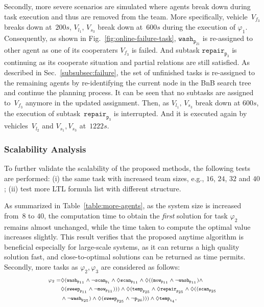  



Secondly, more severe scenarios are simulated where agents break down
during task execution and thus are removed from the team.
More specifically, vehicle~$V_{f_3}$ breaks down at~$200s$, $V_{l_1},\, V_{s_3}$ break
down at~$600s$ during the execution of $\varphi_1$.
Consequently, as shown in Fig.~\ref{fig:online-failure-task}, $\texttt{wash}_{\texttt{p}_{21}}$
is re-assigned to other agent as one of its cooperaters $V_{f_3}$ is failed. And subtask 
$\texttt{repair}_{\texttt{p}_{3}}$ is continuing as its cooperate situation and partial relations 
are still satisfied. As described in Sec.~\ref{subsubsec:failure},
the set of unfinished tasks is re-assigned to the remaining agents by re-identifying
the current node in the BnB search tree and continue the planning process.
It can be seen that no subtasks are assigned to~$V_{f_3}$ anymore in the updated assignment.
Then, as $V_{l_1},\, V_{s_3}$ break down at $600s$, the execution of subtask~$\texttt{repair}_{\texttt{p}_{3}}$ 
is interrupted. And it is executed again by vehicles~$V_{l_2}$ and $V_{s_1},V_{s_3}$ at~$1222s$.



\subsubsection{Scalability Analysis}\label{subsubsec:scalable}
To further validate the scalability of the proposed methods,
the following tests are performed:
(i) the same task with increased team sizes,
e.g., $16$, $24$, $32$ and $40$;
(ii) test more LTL formula list with different structure. 

As summarized in Table~\ref{table:more-agents},
as the system size is increased from~$8$ to $40$,
the computation time to obtain the \emph{first}
solution for task $\varphi_2$ remains almost unchanged,
while the time taken to compute the optimal value increases slightly.
This result verifies that the proposed anytime algorithm is beneficial
especially for large-scale systems, as it can returns a high quality solution fast,
and close-to-optimal solutions can be returned as time permits.
Secondly, more tasks as $\varphi_2,\varphi_3$ are considered as follows:
\begin{equation}\scriptsize
\label{eq:task2}
\begin{aligned}
\varphi_2 = &\Diamond (\texttt{wash}_{\texttt{p}_{11}} \land \lnot\texttt{scan}_{\texttt{p}_i} 
\wedge\Diamond \texttt{scan}_{\texttt{p}_{11}}\wedge \Diamond ((\texttt{mow}_{\texttt{p}_{11}}
\wedge\lnot \texttt{wash}_{\texttt{p}_{11}} )\wedge\\
&\Diamond (\texttt{sweep}_{\texttt{p}_{11}} \land \lnot\texttt{mow}_{\texttt{p}_{11}} )))\wedge
\Diamond (\texttt{temp}_{\texttt{p}_{25}} \land \Diamond \texttt{repair}_{\texttt{p}_{25}}\wedge \Diamond ((\texttt{scan}_{\texttt{p}_{25}}\\
&\wedge\lnot \texttt{wash}_{\texttt{p}_{25}} ) \wedge\Diamond (\texttt{sweep}_{\texttt{p}_{25}} \land \lnot{\texttt{p}_{26}} ))) \wedge  \Diamond
\texttt{temp}_{\texttt{t}_4},
\end{aligned}
\end{equation}  

